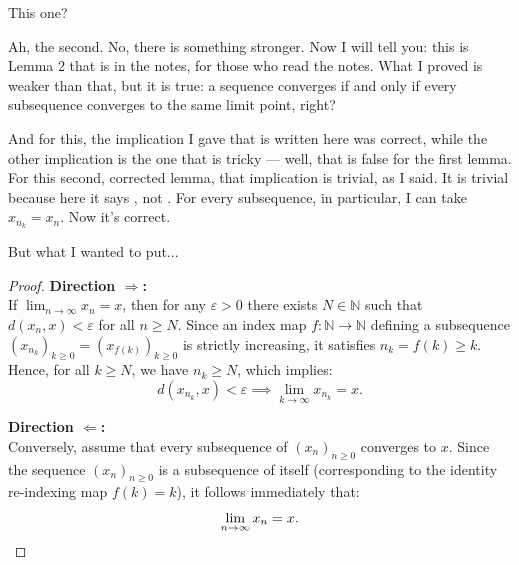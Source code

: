 \begin{speech}[00:44:44 - 00:45:46]
This one?


Ah, the second. No, there is something stronger. Now I will tell you: this is Lemma 2 that is in the notes, for those who read the notes. What I proved is weaker than that, but it is true: a sequence converges if and only if every subsequence converges to the same limit point, right?

And for this, the implication I gave that is written here was correct, while the other implication is the one that is tricky --- well, that is false for the first lemma. For this second, corrected lemma, that implication is trivial, as I said. It is trivial because here it says , not . For every subsequence, in particular, I can take $x_{n_k} = x_n$. Now it's correct.

But what I wanted to put...
\end{speech}

\begin{content}

\begin{proof}
\textbf{Direction \texorpdfstring{$\Longrightarrow$}{=>}:} \\
If $\lim_{n \to \infty} x_n = x$, then for any $\varepsilon > 0$ there exists $N \in \mathbb{N}$ such that $d(x_n, x) < \varepsilon$ for all $n \ge N$. Since an index map $f \colon \mathbb{N} \to \mathbb{N}$ defining a subsequence $(x_{n_k})_{k \ge 0} = (x_{f(k)})_{k \ge 0}$ is strictly increasing, it satisfies $n_k = f(k) \ge k$. Hence, for all $k \ge N$, we have $n_k \ge N$, which implies:
\[
d(x_{n_k}, x) < \varepsilon \implies \lim_{k \to \infty} x_{n_k} = x.
\]

\textbf{Direction \texorpdfstring{$\Longleftarrow$}{<=}:} \\
Conversely, assume that every subsequence of $(x_n)_{n \ge 0}$ converges to $x$. Since the sequence $(x_n)_{n \ge 0}$ is a subsequence of itself (corresponding to the identity re-indexing map $f(k) = k$), it follows immediately that:
\[
\lim_{n \to \infty} x_n = x. \qedhere
\]
\end{proof}
\end{content}

